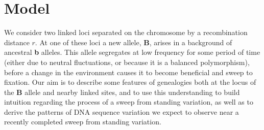 \documentclass[a4paper,10pt]{article}
\newcommand{\gc}[1]{{\it \color{red} (#1)} }
\newcommand{\jb}[1]{{\it\color{blue} (#1)} }
\begin{document}
%
%
%
%
%
\section{Model}


We consider two linked loci separated on the chromosome by a recombination distance $r$. At one of these loci a new allele, \textbf{B}, arises in a background of ancestral \textbf{b} alleles. This allele segregates at low frequency for some period of time (either due to neutral fluctuations, or because it is a balanced polymorphism), before a change in the environment causes it to become beneficial and sweep to fixation. Our aim is to describe some features of genealogies both at the locus of the \textbf{B} allele and nearby linked sites, and to use this understanding to build intuition regarding the process of a sweep from standing variation, as well as to derive the patterns of DNA sequence variation we expect to observe near a recently completed sweep from standing variation.
\end{document}
